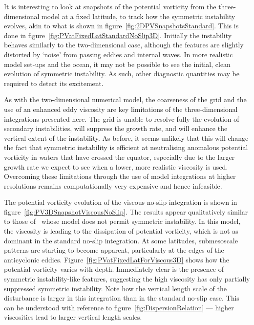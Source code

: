 It is interesting to look at snapshots of the potential vorticity from the three-dimensional model at a fixed latitude, to track how the symmetric instability evolves, akin to what is shown in figure~\ref{fig:2DPVSnapshotsStandard}.
This is done in figure~\ref{fig:PVatFixedLatStandardNoSlip3D}. Initially the instability behaves similarly to the two-dimensional case, although the features are slightly distorted by `noise' from passing eddies and internal waves. In more realistic model set-ups and the ocean, it may not be possible to see the initial, clean evolution of symmetric instability. As such, other diagnostic quantities may be required to detect its excitement.

As with the two-dimensional numerical model, the coarseness of the grid and the use of an enhanced eddy viscosity are key limitations of the three-dimensional integrations presented here. The grid is unable to resolve fully the evolution of secondary instabilities, will suppress the growth rate, and will enhance the vertical extent of the instability. As before, it seems unlikely that this will change the fact that symmetric instability is efficient at neutralising anomalous potential vorticity in waters that have crossed the equator, especially due to the larger growth rate we expect to see when a lower, more realistic viscosity is used. Overcoming these limitations through the use of model integrations at higher resolutions remains computationally very expensive and hence infeasible. 

The potential vorticity evolution of the viscous no-slip integration is shown in figure~\ref{fig:PV3DSnapshotViscousNoSlip}. The results appear qualitatively similar to those of~\citet{Edwards1998I} whose model does not permit symmetric instability. In this model, the viscosity is leading to the dissipation of potential vorticity, which is not as dominant in the standard no-slip integration. At some latitudes, submesoscale patterns are starting to become apparent, particularly at the edges of the anticyclonic eddies. Figure~\ref{fig:PVatFixedLatForViscous3D} shows how the potential vorticity varies with depth. Immediately clear is the presence of symmetric instability-like features, suggesting the high viscosity has only partially suppressed symmetric instability. Note how the vertical length scale of the disturbance is larger in this integration than in the standard no-slip case. This can be understood with reference to figure~\ref{fig:DispersionRelation} --- higher viscosities lead to larger vertical length scales.

